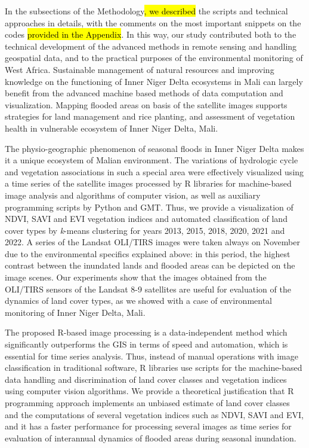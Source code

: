 \documentclass[12pt,a4paper,oneside]{article}
\def \newpar{\vspace{6pt}}
\begin{document}
\newpar In the subsections of the Methodology\hl{, we described} the scripts and technical approaches in details, with the comments on the most important snippets on the codes \hl{provided in the Appendix}. In this way, our study contributed both to the technical development of the advanced methods in remote sensing and handling geospatial data, and to the practical purposes of the environmental monitoring of West Africa. Sustainable management of natural resources and improving knowledge on the functioning of Inner Niger Delta ecosystems in Mali can largely benefit from the advanced machine based methods of data computation and visualization. Mapping flooded areas on basis of the satellite images supports strategies for land management and rice planting, and assessment of vegetation health in vulnerable ecosystem of Inner Niger Delta, Mali. 

\newpar The physio-geographic phenomenon of seasonal floods in Inner Niger Delta makes it a unique ecosystem of Malian environment. The variations of hydrologic cycle and vegetation associations in such a special area were effectively visualized using a time series of the satellite images processed by R libraries for machine-based image analysis and  algorithms of computer vision, as well as auxiliary programming scripts by Python and GMT. Thus, we provide a visualization of NDVI, SAVI and EVI vegetation indices and automated classification of land cover types by \emph{k}-means clustering for years 2013, 2015, 2018, 2020, 2021 and 2022. A series of the Landsat OLI/TIRS images were taken always on November due to the environmental specifics explained above: in this period, the highest contrast between the inundated lands and flooded areas can be depicted on the image scenes. Our experiments show that  the images obtained from the OLI/TIRS sensors of the Landsat 8-9 satellites are useful for evaluation of the dynamics of land cover types, as we showed with a case of environmental monitoring of Inner Niger Delta, Mali. 

\newpar The proposed R-based image processing is a data-independent method which significantly outperforms the GIS in terms of speed and automation, which is essential for time series analysis. Thus, instead of manual operations with image classification in traditional software, R libraries use scripts for the machine-based data handling and discrimination of land cover classes and vegetation indices using computer vision algorithms. We provide a theoretical justification that R programming approach implements an unbiased estimate of land cover classes and the computations of several vegetation indices such as NDVI, SAVI and EVI, and it has a faster performance for processing several images as time series for evaluation of interannual dynamics of flooded areas during seasonal inundation. 
\end{document}
